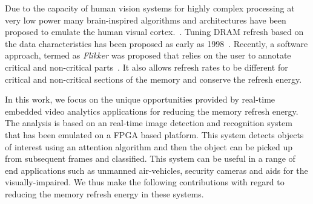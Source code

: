 
Due to the capacity of human vision systems for highly complex processing at very low power many brain-inspired algorithms and architectures have been proposed to emulate the human visual cortex.~\cite{Nere2011,Chen2014,Kestur2012}. %
Tuning DRAM refresh based on the data characteristics has been proposed as early as 1998~\cite{islped98}. Recently, a software approach, termed as \emph{Flikker} was proposed that relies on the user to annotate critical and non-critical parts~\cite{Liu2011}. It also allows refresh rates to be different for critical and non-critical sections of the memory and conserve the refresh energy. 

In this work, we focus on the unique opportunities provided by real-time embedded video analytics applications for reducing the memory refresh energy. The analysis is based on an real-time image detection and recognition system that has been emulated on a FPGA based platform. This system detects objects of interest using an attention algorithm and then the object can be picked up from subsequent frames and classified. This system can be useful in a range of end applications such as unmanned air-vehicles, security cameras and aids for the visually-impaired. We thus make the following contributions with regard to reducing the memory refresh energy in these systems.

